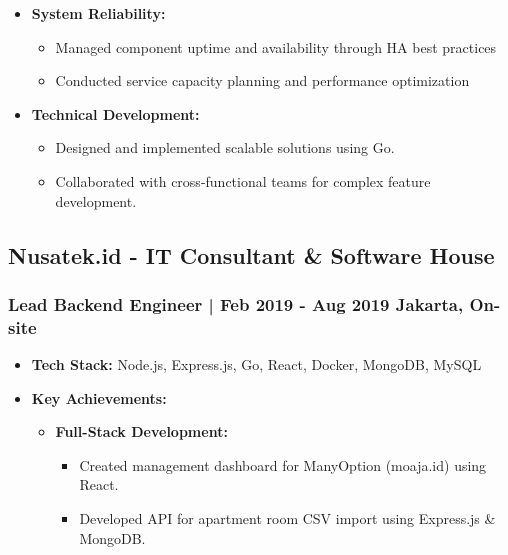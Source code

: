 \documentclass[11pt]{article}
\begin{document}
\begin{itemize}
\begin{itemize}
\begin{itemize}
        \end{itemize}
        \item \textbf{System Reliability:}
        \begin{itemize}
            \item Managed component uptime and availability through HA best practices
            \item Conducted service capacity planning and performance optimization
        \end{itemize}
        \item \textbf{Technical Development:}
        \begin{itemize}
            \item Designed and implemented scalable solutions using Go.
            \item Collaborated with cross-functional teams for complex feature development.
        \end{itemize}
    \end{itemize}
\end{itemize}



\subsection{Nusatek.id - IT Consultant \& Software House}
\subsubsection{Lead Backend Engineer | Feb 2019 - Aug 2019 \hfill Jakarta, On-site}
\begin{itemize}
    \item \textbf{Tech Stack:} Node.js, Express.js, Go, React, Docker, MongoDB, MySQL
    \item \textbf{Key Achievements:}
    \begin{itemize}
        \item \textbf{Full-Stack Development:}
        \begin{itemize}
            \item Created management dashboard for ManyOption (moaja.id) using React.
            \item Developed API for apartment room CSV import using Express.js \& MongoDB.
        \end{itemize}
    \end{itemize}
\end{itemize}
\end{document}

